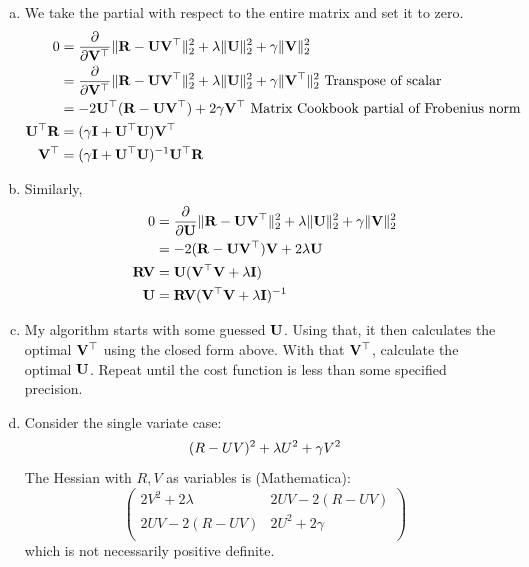 \documentclass[12pt,letterpaper,fleqn]{hmcpset}
\begin{document}
\begin{solution}
    \begin{enumerate}[(a)]
        \item
            We take the partial with respect to the entire matrix and set it to zero. 
            \begin{align*}
                0 &= \frac{\partial}{\partial {\bf V}^\top} \|{\bf R} - {\bf U}{\bf V}^\top\|_2^2 + \lambda\|{\bf U}\|_2^2 + \gamma\|{\bf V}\|_2^2 \\
                &= \frac{\partial}{\partial {\bf V}^\top} \|{\bf R} - {\bf U} {\bf V}^\top  \|_2^2 + \lambda\|{\bf U}\|_2^2 + \gamma\|{\bf V}^\top \|_2^2 \text{ Transpose of scalar} \\
                &= -2{\bf U}^\top({\bf R} - {\bf U}{\bf V}^\top) + 2\gamma {\bf V}^\top \text{ Matrix Cookbook partial of Frobenius norm} \\
                {\bf U}^\top {\bf R} &= (\gamma {\bf I}  + {\bf U}^\top {\bf U}) {\bf V}^\top  \\
                {\bf V}^\top &= (\gamma {\bf I}  + {\bf U}^\top {\bf U})^{-1} {\bf U}^\top {\bf R}
            \end{align*}
        \item
            Similarly,
            \begin{align*}
                0 &= \frac{\partial}{\partial {\bf U}} \|{\bf R} - {\bf U}{\bf V}^\top\|_2^2 + \lambda\|{\bf U}\|_2^2 + \gamma\|{\bf V}\|_2^2 \\
                &= -2 ({\bf R} - {\bf U}{\bf V}^\top) {\bf V} + 2 \lambda {\bf U} \\
                {\bf R} {\bf V} &= {\bf U} ({\bf V}^\top {\bf V} + \lambda {\bf I}) \\
                {\bf U} &= {\bf R} {\bf V}({\bf V}^\top {\bf V} + \lambda {\bf I})^{-1}
            \end{align*}
        \item
            My algorithm starts with some guessed ${\bf U}$. Using that, it then calculates the optimal ${\bf V}^\top$ using the closed form above. With that ${\bf V}^\top$, calculate the optimal ${\bf U}$. Repeat until the cost function is less than some specified precision.
        \item
            Consider the single variate case:
            $$
                (R-UV)^2 + \lambda U^2 + \gamma V^2\\       
            $$
            The Hessian with $R, V$ as variables is (Mathematica):
            $$\left(
                \begin{array}{cc}
                 2 V^2+2 \lambda  & 2 U V-2 (R-U V) \\
                 2 U V-2 (R-U V) & 2 U^2+2 \gamma  \\
                \end{array}
            \right)$$
            which is not necessarily positive definite.


    \end{enumerate}
\end{solution}
\end{document}
